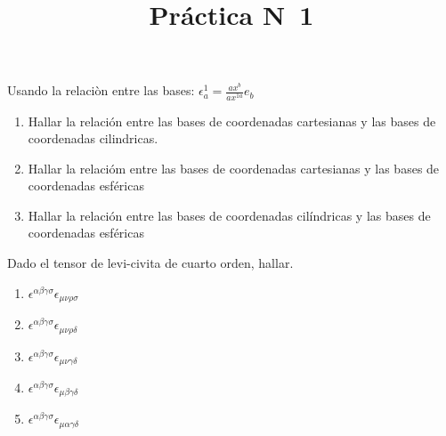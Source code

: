 \documentclass[12pt,a4paper]{practice}
\begin{document}
    \title{Práctica N\textdegree\ 1}
    \maketitle

    \begin{problem}\label{prob:1}
        Usando la relaciòn entre las bases: $\epsilon^{1}_{a}=\frac{ax^{b}}{ax^{1a}}e_{b}$
            \begin{enumerate}[label=(\alph*)]
                \item Hallar la relación entre las bases de coordenadas cartesianas y las bases de coordenadas cilindricas.
                \item Hallar la relacióm entre las bases de coordenadas cartesianas y las bases de coordenadas esféricas 
                \item Hallar la relación entre las bases de coordenadas cilíndricas y las bases de coordenadas esféricas
             \end{enumerate}  
    \end{problem}

    \begin{problem}\label{prob:2}
        Dado el tensor de levi-civita de cuarto orden, hallar.
            \begin{enumerate}[label=(\alph*)]
                \item $\epsilon^{\alpha\beta\gamma\sigma} \epsilon_{\mu\nu\rho\sigma}$
                \item $\epsilon^{\alpha\beta\gamma\sigma} \epsilon_{\mu\nu\rho\delta}$
                \item $\epsilon^{\alpha\beta\gamma\sigma} \epsilon_{\mu\nu\gamma\delta}$
                \item $\epsilon^{\alpha\beta\gamma\sigma} \epsilon_{\mu\beta\gamma\delta}$
                \item $\epsilon^{\alpha\beta\gamma\sigma} \epsilon_{\mu\alpha\gamma\delta}$
             \end{enumerate}  
    \end{problem}
    
\end{document}
